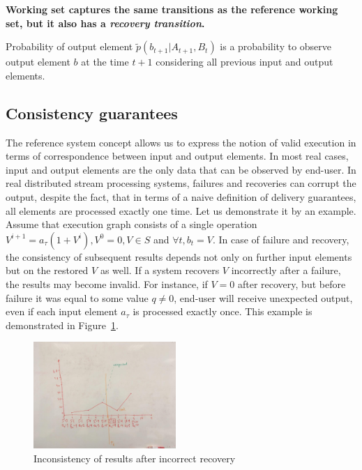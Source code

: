 {\bf Working set captures the same transitions as the reference working set, but it also has a {\em recovery transition}.}

\begin{definition}{Probability of output element}
$\widetilde{p}(b_{t+1}|A_{t+1}, B_t)$ is a probability to observe output element $b$ at the time $t+1$ considering all previous input and output elements.
\end{definition}

\subsection{Consistency guarantees}

The reference system concept allows us to express the notion of valid execution in terms of correspondence between input and output elements. In most real cases, input and output elements are the only data that can be observed by end-user. In real distributed stream processing systems, failures and recoveries can corrupt the output, despite the fact, that in terms of a naive definition of delivery guarantees, all elements are processed exactly one time. Let us demonstrate it by an example. Assume that execution graph consists of a single operation $V^{i+1}=a_\tau(1+V^{i}),V^{0}=0,V\in{S}$ and $\forall{t},b_t=V$. In case of failure and recovery, the consistency of subsequent results depends not only on further input elements but on the restored $V$ as well. If a system recovers $V$ incorrectly after a failure, the results may become invalid. For instance, if $V=0$ after recovery, but before failure it was equal to some value $q\neq{0}$, end-user will receive unexpected output, even if each input element $a_\tau$ is processed exactly once. This example is demonstrated in Figure~\ref{state-inconsistency}. 

\begin{figure}[htbp]
  \centering
  \includegraphics[width=0.48\textwidth]{pics/state-inconsistency}
  \caption{Inconsistency of results after incorrect recovery}
  \label {state-inconsistency}
\end{figure}

